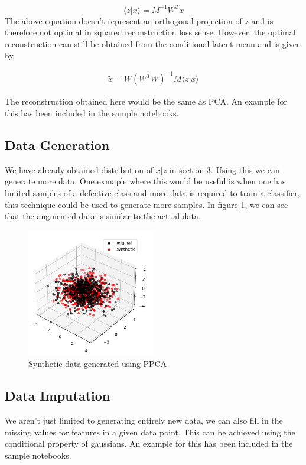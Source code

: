\documentclass[10pt,onecolumn,letterpaper]{article}
\begin{document}
$$\langle z|x \rangle = M^{-1}W^Tx$$
The above equation doesn't represent an orthogonal projection of $z$ and is therefore not optimal in squared reconstruction loss sense. However, the optimal reconstruction can still be obtained from the conditional latent mean and is given by

\begin{align}
\tilde x = W (W^TW)^{-1}M \langle z|x \rangle
\end{align}

The reconstruction obtained here would be the same as PCA. An example for this has been included in the sample notebooks.

\subsection{Data Generation}
We have already obtained distribution of $x|z$ in section 3. Using this we can generate more data. One exmaple where this would be useful is when one has limited samples of a defective class and more data is required to train a classifier, this technique could be used to generate more samples. In figure \ref{fig:data_gen}, we can see that the augmented data is similar to the actual data.

\begin{figure}
    \centering
    \includegraphics[width=0.5\textwidth]{./data_gen.png}
    \caption{Synthetic data generated using PPCA}
    \label{fig:data_gen}
\end{figure}

\subsection{Data Imputation}
We aren't just limited to generating entirely new data, we can also fill in the missing values for features in a given data point. This can be achieved using the conditional property of gaussians. An example for this has been included in the sample notebooks.
\end{document}
